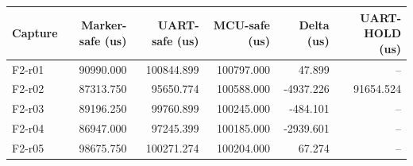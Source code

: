 \begin{tabular}{lrrrrr}
Capture & Marker-safe (us) & UART-safe (us) & MCU-safe (us) & Delta (us) & UART-HOLD (us) \\
\hline
F2-r01 & 90990.000 & 100844.899 & 100797.000 & 47.899 & -- \\
F2-r02 & 87313.750 & 95650.774 & 100588.000 & -4937.226 & 91654.524 \\
F2-r03 & 89196.250 & 99760.899 & 100245.000 & -484.101 & -- \\
F2-r04 & 86947.000 & 97245.399 & 100185.000 & -2939.601 & -- \\
F2-r05 & 98675.750 & 100271.274 & 100204.000 & 67.274 & -- \\
\end{tabular}
